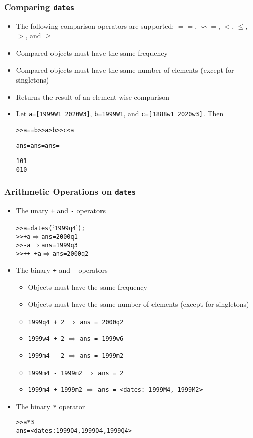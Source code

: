 \documentclass[10pt]{beamer}
\newcommand{\myitem}{\item[$\bullet$]}
\begin{document}
\begin{frame}[fragile,t]
  \frametitle{Comparing \texttt{dates}}
  \begin{itemize}
    \myitem The following comparison operators are supported: $==$, $\backsim=$, $<$, $\leq$, $>$, and $\geq$
    \myitem Compared objects must have the same frequency
    \myitem Compared objects must have the same number of elements (except for singletons)
    \myitem Returns the result of an element-wise comparison
    \myitem Let \texttt{a=[1999W1 2020W3]}, \texttt{b=1999W1}, and \texttt{c=[1888w1 2020w3]}. Then
    \begin{alltt}
  >> a == b              >> a > b              >> c < a

  ans =                  ans =                 ans =

       1                      0                     1
       0                      1                     0
    \end{alltt}
  \end{itemize}
\end{frame}



\begin{frame}[fragile,t]
  \frametitle{Arithmetic Operations on \texttt{dates}}
  \begin{itemize}
    \myitem The unary \texttt{+} and \texttt{-} operators
    \begin{alltt}
  >> a = dates(`1999q4');
  >> +a \(\Rightarrow\) ans = 2000q1
  >> -a \(\Rightarrow\) ans = 1999q3
  >> ++-+a \(\Rightarrow\) ans = 2000q2
    \end{alltt}
    \myitem The binary \texttt{+} and \texttt{-} operators
    \begin{itemize}
      \myitem Objects must have the same frequency
      \myitem Objects must have the same number of elements (except for singletons)
      \myitem \texttt{1999q4 + 2} $\Rightarrow$ \texttt{ans = 2000q2}
      \myitem \texttt{1999w4 + 2} $\Rightarrow$ \texttt{ans = 1999w6}
      \myitem \texttt{1999m4 - 2} $\Rightarrow$ \texttt{ans = 1999m2}
      \myitem \texttt{1999m4 - 1999m2} $\Rightarrow$ \texttt{ans = 2}
      \myitem \texttt{1999m4 + 1999m2} $\Rightarrow$ \texttt{ans = <dates: 1999M4, 1999M2>}
    \end{itemize}
    \myitem The binary \texttt{*} operator
    \begin{alltt}
  >> a*3
  ans = <dates: 1999Q4, 1999Q4, 1999Q4>
    \end{alltt}
  \end{itemize}
\end{frame}
\end{document}
